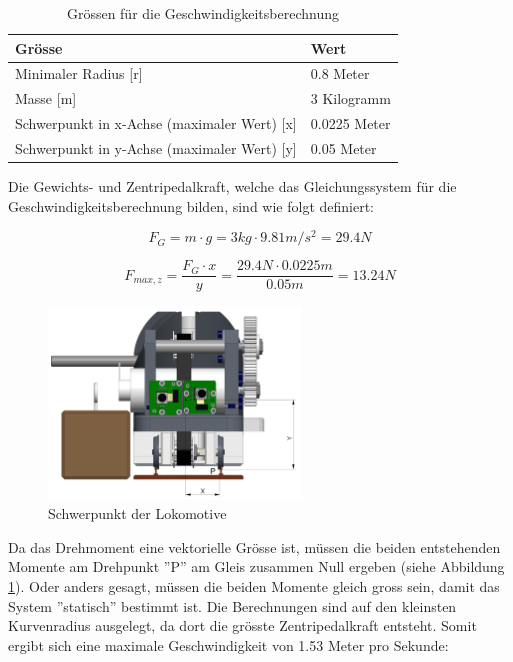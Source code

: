 \documentclass[../../main.tex]{subfiles}
\begin{document}
\begin{table}[H] \centering
    \begin{tabular}{|l|l|}
    \hline
    \textbf{Grösse} & \textbf{Wert}\\
    \hline
    Minimaler Radius  [r]                               & 0.8 Meter\\
     \hline
    Masse [m]                                           & 3 Kilogramm\\
    \hline
    Schwerpunkt in x-Achse (maximaler Wert) [x]         & 0.0225 Meter\\
    \hline
    Schwerpunkt in y-Achse (maximaler Wert) [y]         & 0.05 Meter\\
    \hline
    \end{tabular}

    \caption{Grössen für die Geschwindigkeitsberechnung}
    \label{tab:geschwindigkeitsberechnung}
    \end{table}

Die Gewichts- und Zentripedalkraft, welche das Gleichungssystem für die Geschwindigkeitsberechnung bilden, sind wie folgt definiert:

$$F_{G}=m \cdot g=3kg \cdot 9.81m/s^2=29.4N$$

$$F_{max, z}=\frac{F_{G} \cdot x}{y}=\frac{29.4N \cdot 0.0225m}{0.05m}=13.24N$$

\begin{figure}[H]
    \centering
    \includegraphics[width=0.6\textwidth]{schwerpunkt.PNG}
    \caption {Schwerpunkt der Lokomotive}
    \label{fig:schwerpunkt}
\end{figure}

Da das Drehmoment eine vektorielle Grösse ist, müssen die beiden entstehenden Momente am Drehpunkt ''P'' am Gleis zusammen Null ergeben (siehe Abbildung \ref{fig:schwerpunkt}). Oder anders gesagt, müssen die beiden Momente gleich gross sein, damit das System ''statisch'' bestimmt ist. Die Berechnungen sind auf den kleinsten Kurvenradius ausgelegt, da dort die grösste Zentripedalkraft entsteht. Somit ergibt sich eine maximale Geschwindigkeit von 1.53 Meter pro Sekunde:
\end{document}
